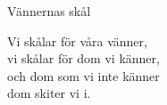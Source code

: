 \begin{song}{Vännernas skål}
	
	
	
	
	Vi skålar för våra vänner,\\
	vi skålar för dom vi känner,\\
	och dom som vi inte känner\\
	dom skiter vi i.
	
\end{song}
